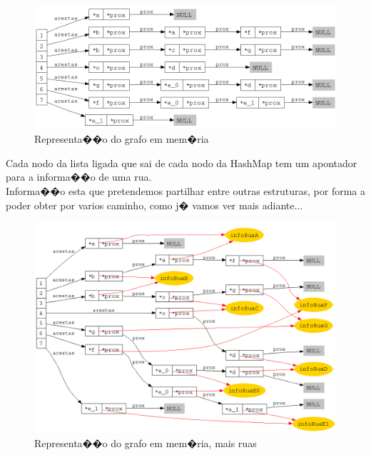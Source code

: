 \documentclass[11pt,a4paper]{article}
\newenvironment{mtc}{\secttoc\sectlof}{\pagebreak}
\begin{document}
\begin{mtc}
\begin{figure}[!htb]\label{grafo_memoria}
    \centering
        \includegraphics[width=.9\textwidth]{stuff/grafo_memoria_rel.png}
    \caption{Representa��o do grafo em mem�ria}
\end{figure}

Cada nodo da lista ligada que sai de cada nodo da \textsf{HashMap} tem um apontador para a informa��o de uma rua.
\\

Informa��o esta que pretendemos partilhar entre outras estruturas, por forma a poder obter por varios caminho, como j� vamos
ver mais adiante...
\\

\begin{figure}[!htb]\label{grafo_memoria_full}
    \centering
        \includegraphics[width=.9\textwidth]{stuff/grafo_memoria_rel_full.png}
    \caption{Representa��o do grafo em mem�ria, mais ruas}
\end{figure}


\end{mtc}
\end{document}
